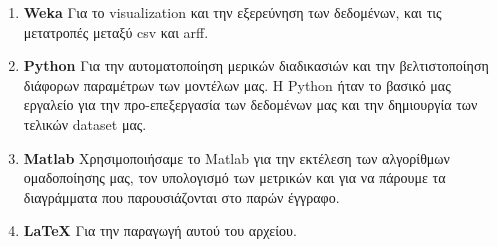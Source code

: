 \begin{enumerate}
	\item \textbf{Weka}
	Για το visualization και την εξερεύνηση των δεδομένων,
	και τις μετατροπές μεταξύ csv και arff.
	\item \textbf{Python}
	Για την αυτοματοποίηση μερικών διαδικασιών
	και την βελτιστοποίηση διάφορων παραμέτρων των μοντέλων μας. Η Python ήταν το βασικό μας εργαλείο για την προ-επεξεργασία των δεδομένων μας και την δημιουργία των τελικών dataset μας.
	\item \textbf{Matlab{}}
	Χρησιμοποιήσαμε το Matlab για την εκτέλεση των αλγορίθμων ομαδοποίησης μας, τον υπολογισμό των μετρικών και για να πάρουμε τα διαγράμματα που παρουσιάζονται στο παρών έγγραφο.
	\item \textbf{\LaTeX{}}
	Για την παραγωγή αυτού του αρχείου.
\end{enumerate}